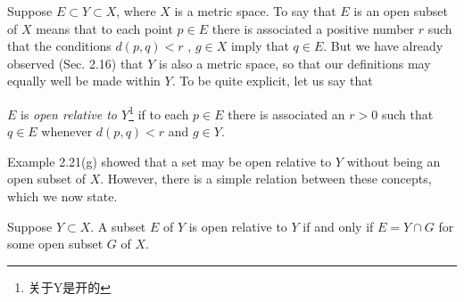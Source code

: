 \begin{myRemark}
    Suppose $E \subset Y \subset X$, where $X$ is a metric space. To say that $E$ is an open subset of $X$ means that to each point $p \in E$ there is associated a positive number $r$ such that the conditions $d(p,q) < r$ , $g \in X$ imply that $q \in E$. But we have already observed (Sec. 2.16) that $Y$ is also a metric space, so that our definitions may equally well be made within $Y$. To be quite explicit, let us say that 
    
    $E$ is \emph{open relative to $Y$}\footnote{关于Y是开的} if to each $p \in E$ there is associated an $r > 0$ such that $q \in E$ whenever $d(p,q) <r$ and $g \in Y$. 
    
    Example 2.21(g) showed that a set may be open relative to $Y$ without being an open subset of $X$. However, there is a simple relation between these concepts, which we now state.
\end{myRemark}

\begin{thm}
    \label{thm:2.30}
    Suppose $Y \subset X$. A subset $E$ of $Y$ is open relative to $Y$ if and only if $E = Y \cap G$ for some open subset $G$ of $X$.
\end{thm}